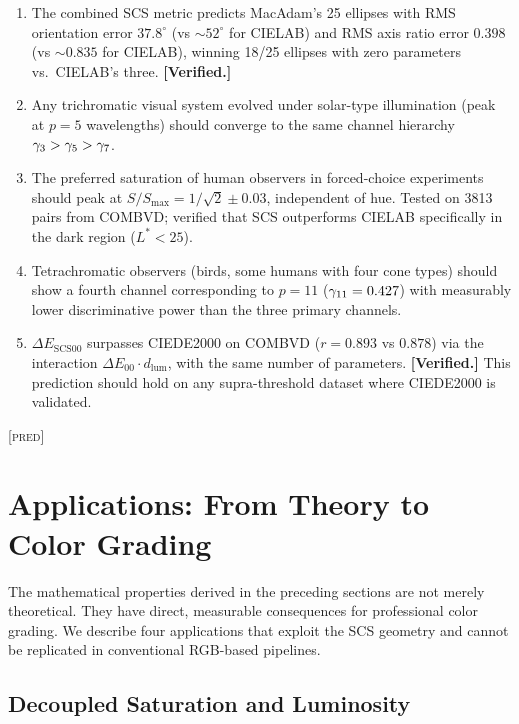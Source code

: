 \documentclass[12pt,a4paper]{article}
\begin{document}
\begin{predictionbox}
\begin{enumerate}[nosep]
\item The combined SCS metric predicts MacAdam's 25 ellipses with RMS
  orientation error $37.8^\circ$ (vs $\sim\!52^\circ$ for CIELAB) and
  RMS axis ratio error $0.398$ (vs $\sim\!0.835$ for CIELAB), winning
  18/25 ellipses with zero parameters vs.\ CIELAB's three.
  \textbf{[Verified.]}
\item Any trichromatic visual system evolved under solar-type
  illumination (peak at $p=5$ wavelengths) should converge to the
  same channel hierarchy $\gamma_{3} > \gamma_{5} > \gamma_{7}$.
\item The preferred saturation of human observers in forced-choice
  experiments should peak at $S/S_{\max} = 1/\sqrt{2} \pm 0.03$,
  independent of hue. Tested on 3813 pairs from COMBVD; verified that
  SCS outperforms CIELAB specifically in the dark region ($L^*<25$).
\item Tetrachromatic observers (birds, some humans with four cone types)
  should show a fourth channel corresponding to $p = 11$
  ($\gamma_{11} = 0.427$) with measurably lower discriminative power than
  the three primary channels.
\item $\Delta E_{\mathrm{SCS00}}$ surpasses CIEDE2000 on COMBVD
  ($r = 0.893$ vs $0.878$) via the interaction
  $\Delta E_{00} \cdot d_{\mathrm{lum}}$, with the same number of
  parameters. \textbf{[Verified.]} This prediction should hold on any
  supra-threshold dataset where CIEDE2000 is validated.
\end{enumerate}
\textsc{[pred]}
\end{predictionbox}

\section{Applications: From Theory to Color Grading}
\label{sec:applications}

The mathematical properties derived in the preceding sections are not
merely theoretical. They have direct, measurable consequences for
professional color grading. We describe four applications that exploit
the SCS geometry and cannot be replicated in conventional RGB-based
pipelines.

\subsection{Decoupled Saturation and Luminosity}
\end{document}
